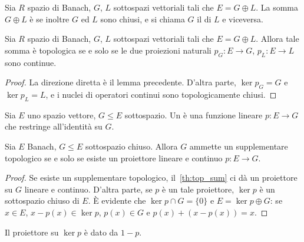\begin{definition}
	Sia $R$ spazio di Banach, $G$, $L$ sottospazi vettoriali tali che $E=G \oplus L$. La somma $G \oplus L$ è  se inoltre $G$ ed $L$ sono chiusi, e si chiama $G$ il  di $L$ e viceversa.
\end{definition}

\begin{theorem}
\label{th:top_sum}
	Sia $R$ spazio di Banach, $G$, $L$ sottospazi vettoriali tali che $E=G \oplus L$.
	Allora tale somma è topologica se e solo se le due proiezioni naturali $p_G : E \to G$, $p_L : E \to L$ sono continue.
\end{theorem}
\begin{proof}
	La direzione diretta è il lemma precedente. D'altra parte, $\ker p_G = G$ e $\ker p_L = L$, e i nuclei di operatori continui sono topologicamente chiusi.
\end{proof}

\begin{definition}
\label{def:projector}
	Sia $E$ uno spazio vettore, $G \leq E$ sottospazio.
	Un  è una funzione lineare $p:E \to G$ che restringe all'identità su $G$.
\end{definition}

\begin{lemma}
	Sia $E$ Banach, $G \leq E$ sottospazio chiuso.
	Allora $G$ ammette un supplementare topologico se e solo se esiste un proiettore lineare e continuo $p:E \to G$.
\end{lemma}
\begin{proof}
	Se esiste un supplementare topologico, il~\ref{th:top_sum} ci dà un proiettore su $G$ lineare e continuo.
	D'altra parte, se $p$ è un tale proiettore, $\ker p$ è un sottospazio chiuso di $E$. È evidente che $\ker p \cap G = \{0\}$ e $E = \ker p \oplus G$: se $x \in E$, $x - p(x) \in \ker p$, $p(x) \in G$ e $p(x) +(x- p(x)) = x$.
\end{proof}

\begin{remark}
	Il proiettore su $\ker p$ è dato da $1-p$.
\end{remark}

